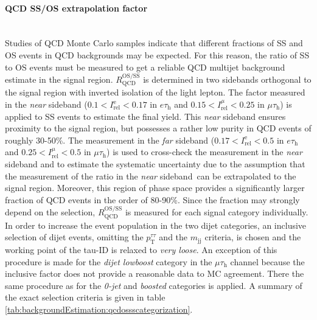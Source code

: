 \paragraph{QCD SS/OS extrapolation factor}\label{sec:qcdosss}\mbox{} \\ 
Studies of QCD Monte Carlo samples indicate that different fractions of SS and 
OS events in QCD backgrounds may be expected. For this reason, the ratio of SS to OS events must be measured to get a reliable 
QCD multijet background estimate in the signal region.
$R_\text{QCD}^\text{OS/SS}$ is determined in two sidebands orthogonal to the 
signal region  with inverted isolation of the light lepton. The factor measured in the \textit{near} sideband ($\text{0.1}<I_\text{rel}^\text{e}<\text{0.17}$ in $e\tau_\text{h}$ and $\text{0.15}<I_\text{rel}^{\mu}<\text{0.25}$ in $\mu\tau_\text{h}$)
is applied to SS events to estimate the final yield. This \textit{near} sideband ensures proximity to the signal region, but 
possesses a rather low purity in QCD events of roughly 30-50\%. %
The measurement in the \textit{far} sideband ($\text{0.17}<I_\text{rel}^\text{e}<\text{0.5}$ in $e\tau_\text{h}$ and $\text{0.25}<I_\text{rel}^{\mu}<\text{0.5}$ in $\mu\tau_\text{h}$) is used to cross-check the measurement in the \textit{near} sideband
and to estimate the systematic uncertainty due to the assumption that the
measurement of the ratio in the \textit{near} sideband can be extrapolated to the 
signal region. Moreover, this region of phase space provides a significantly larger fraction of QCD events in the order of 80-90\%. %
Since the fraction may strongly depend on the selection, $R_\text{QCD}^\text{OS/SS}$ is measured for each
signal category individually. In order to increase the event population in the two dijet categories, an inclusive selection of dijet events, omitting the $p_{\text{T}}^{\tau\tau}$ and the
$m_\text{jj}$ criteria, is chosen and the working point of the tau-ID is relaxed to \textit{very loose}. An exception of this procedure is made for the \textit{dijet lowboost} category in the $\mu\tau_\text{h}$ channel because the 
inclusive factor does not provide a reasonable data to MC agreement. There the same procedure as for the \textit{0-jet} and \textit{boosted} categories is applied. A summary of the exact selection criteria is given in table \ref{tab:backgroundEstimation:qcdossscategorization}.   

